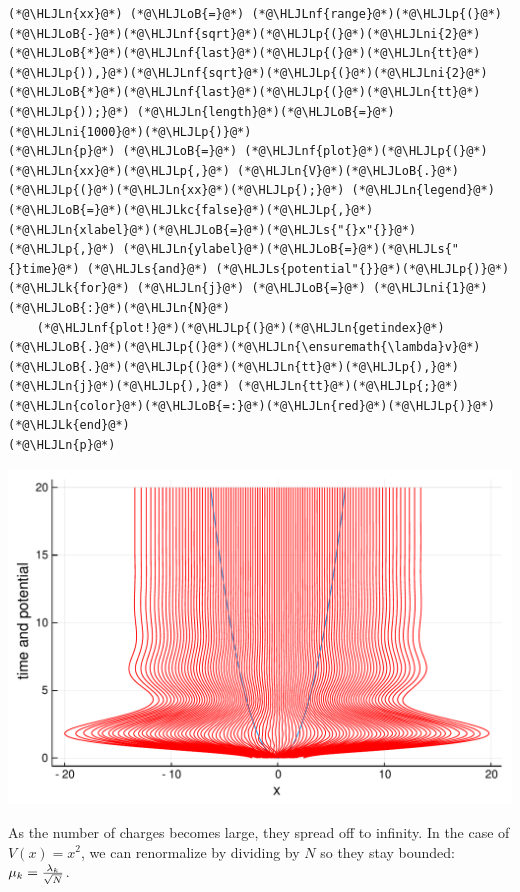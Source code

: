\documentclass[12pt,a4paper]{article}
\newcommand{\HLJLk}[1]{\textcolor[RGB]{148,91,176}{\textbf{#1}}}
\newcommand{\HLJLkc}[1]{\textcolor[RGB]{59,151,46}{\textit{#1}}}
\newcommand{\HLJLn}[1]{#1}
\newcommand{\HLJLnf}[1]{\textcolor[RGB]{66,102,213}{#1}}
\newcommand{\HLJLs}[1]{\textcolor[RGB]{201,61,57}{#1}}
\newcommand{\HLJLni}[1]{\textcolor[RGB]{59,151,46}{#1}}
\newcommand{\HLJLoB}[1]{\textcolor[RGB]{102,102,102}{\textbf{#1}}}
\newcommand{\HLJLp}[1]{#1}
\begin{document}
\begin{lstlisting}
(*@\HLJLn{xx}@*) (*@\HLJLoB{=}@*) (*@\HLJLnf{range}@*)(*@\HLJLp{(}@*)(*@\HLJLoB{-}@*)(*@\HLJLnf{sqrt}@*)(*@\HLJLp{(}@*)(*@\HLJLni{2}@*)(*@\HLJLoB{*}@*)(*@\HLJLnf{last}@*)(*@\HLJLp{(}@*)(*@\HLJLn{tt}@*)(*@\HLJLp{)),}@*)(*@\HLJLnf{sqrt}@*)(*@\HLJLp{(}@*)(*@\HLJLni{2}@*)(*@\HLJLoB{*}@*)(*@\HLJLnf{last}@*)(*@\HLJLp{(}@*)(*@\HLJLn{tt}@*)(*@\HLJLp{));}@*) (*@\HLJLn{length}@*)(*@\HLJLoB{=}@*)(*@\HLJLni{1000}@*)(*@\HLJLp{)}@*)
(*@\HLJLn{p}@*) (*@\HLJLoB{=}@*) (*@\HLJLnf{plot}@*)(*@\HLJLp{(}@*)(*@\HLJLn{xx}@*)(*@\HLJLp{,}@*) (*@\HLJLn{V}@*)(*@\HLJLoB{.}@*)(*@\HLJLp{(}@*)(*@\HLJLn{xx}@*)(*@\HLJLp{);}@*) (*@\HLJLn{legend}@*)(*@\HLJLoB{=}@*)(*@\HLJLkc{false}@*)(*@\HLJLp{,}@*) (*@\HLJLn{xlabel}@*)(*@\HLJLoB{=}@*)(*@\HLJLs{"{}x"{}}@*)(*@\HLJLp{,}@*) (*@\HLJLn{ylabel}@*)(*@\HLJLoB{=}@*)(*@\HLJLs{"{}time}@*) (*@\HLJLs{and}@*) (*@\HLJLs{potential"{}}@*)(*@\HLJLp{)}@*)
(*@\HLJLk{for}@*) (*@\HLJLn{j}@*) (*@\HLJLoB{=}@*) (*@\HLJLni{1}@*)(*@\HLJLoB{:}@*)(*@\HLJLn{N}@*)
    (*@\HLJLnf{plot!}@*)(*@\HLJLp{(}@*)(*@\HLJLn{getindex}@*)(*@\HLJLoB{.}@*)(*@\HLJLp{(}@*)(*@\HLJLn{\ensuremath{\lambda}v}@*)(*@\HLJLoB{.}@*)(*@\HLJLp{(}@*)(*@\HLJLn{tt}@*)(*@\HLJLp{),}@*)(*@\HLJLn{j}@*)(*@\HLJLp{),}@*) (*@\HLJLn{tt}@*)(*@\HLJLp{;}@*) (*@\HLJLn{color}@*)(*@\HLJLoB{=:}@*)(*@\HLJLn{red}@*)(*@\HLJLp{)}@*)
(*@\HLJLk{end}@*)
(*@\HLJLn{p}@*)
\end{lstlisting}

\includegraphics[width=\linewidth]{figures/Lecture16_4_1.pdf}

As the number of charges becomes large, they spread off to infinity. In the case of $V(x) = x^2$,  we can renormalize by  dividing by $N$ so they stay bounded: $\mu_k = {\lambda_k \over \sqrt N}$.
\end{document}
